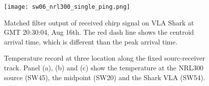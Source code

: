 \clearpage


\begin{figure}[H]
 \centering
 \texttt{[image: sw06\_nrl300\_single\_ping.png]}
 \caption{Matched filter output of received chirp signal on VLA Shark at GMT 20:30:04, Aug 16th. The red dash line shows the centroid arrival time, which is different than the peak arrival time. }\label{fig:nrl300_single}
\end{figure}

%

\begin{figure}[!ht]
    \caption{Temperature record at three location along the fixed sourc-receiver track. Panel (a), (b) and (c) show the temperature at the NRL300 source (SW45), the midpoint (SW20) and the Shark VLA (SW54).}
    \label{fig:nrl300_temp_1}
\end{figure}


